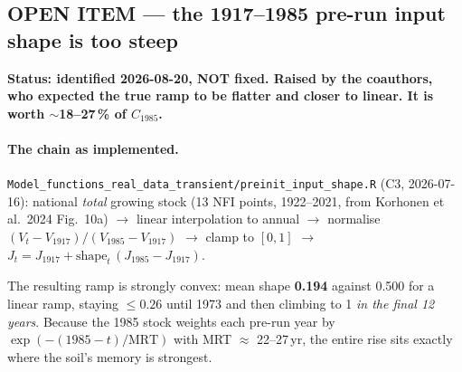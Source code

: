 \documentclass[11pt]{article}
\begin{document}
\subsection{OPEN ITEM --- the 1917--1985 pre-run input shape is too steep}
\label{sec:preinitshape}

\textbf{Status: identified 2026-08-20, NOT fixed. Raised by the coauthors, who expected the
true ramp to be flatter and closer to linear. It is worth $\sim$18--27\,\% of $C_{1985}$.}

\paragraph{The chain as implemented.} \texttt{Model\_functions\_real\_data\_transient/preinit\_input\_shape.R}
(C3, 2026-07-16): national \emph{total} growing stock (13 NFI points, 1922--2021, from Korhonen
et al.\ 2024 Fig.\ 10a) $\rightarrow$ linear interpolation to annual $\rightarrow$ normalise
$(V_t-V_{1917})/(V_{1985}-V_{1917})$ $\rightarrow$ clamp to $[0,1]$ $\rightarrow$
$J_t = J_{1917} + \text{shape}_t\,(J_{1985}-J_{1917})$.

The resulting ramp is strongly convex: mean shape \textbf{0.194} against 0.500 for a linear ramp,
staying $\le 0.26$ until 1973 and then climbing to 1 \emph{in the final 12 years}. Because the
1985 stock weights each pre-run year by $\exp(-(1985-t)/\mathrm{MRT})$ with MRT $\approx$ 22--27\,yr,
the entire rise sits exactly where the soil's memory is strongest.
\end{document}
